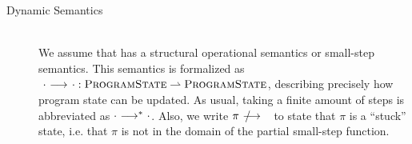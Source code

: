 \begin{description}
\begin{comment}
    Let $\setProgramState_s$ (with $s \in \setStmt$) be the set of program states having $s$ as upcoming work.
    This notion will be necessary to define soundness of \svl's static semantics.
    
    Examples:
    \begin{description}
        \item[Primitive]
        \begin{flalign*}
        	 & \setProgramState ~=~ \underbrace{(\setVar \rightharpoonup \mathbb{Z})}_{\textit{variable memory}} ~\times~ \setStmt & ~ \\
        	 & \setProgramState_s ~=~ (\setVar \rightharpoonup \mathbb{Z}) ~\times~ \setStmt_s                                     &
        \end{flalign*}
        
        \item[Stack]
        \begin{flalign*}
        	 & \setProgramState ~=~ \bigcup_{i \in \mathbb{N}_+}{\underbrace{\Big((\setVar \rightharpoonup \mathbb{Z}) ~\times~ \setStmt \Big)}_{\textit{stack frame}}}^i                                                                                \\
        	 & \setProgramState_s ~=~ \Big((\setVar \rightharpoonup \mathbb{Z}) ~\times~ \setStmt_s\Big) ~\times~ \underbrace{\bigcup_{i \in \mathbb{N}_0}{\Big((\setVar \rightharpoonup \mathbb{Z}) ~\times~ \setStmt \Big)^i}}_{\textit{lower frames}}
        \end{flalign*}
    \end{description}
     
    \end{comment}
    
    
\item[Dynamic Semantics]~\\
    We assume that \svl has a structural operational semantics or small-step semantics.
    This semantics is formalized as $~{\cdot} \,\,{\longrightarrow^{}}\,\, {\cdot} : \textup{\textsc{ProgramState}} \rightharpoonup \textup{\textsc{ProgramState}}$, describing precisely how program state can be updated. %
    As usual, 
    taking a finite amount of steps is abbreviated as ${\cdot} \,\,{\longrightarrow^{*}}\,\, {\cdot}$.
    Also, we write $\sstepStuck{\pi}$ to state that $\pi$ is a “stuck” state, i.e. that $\pi$ is not in the domain of the partial small-step function.
    

\end{description}
